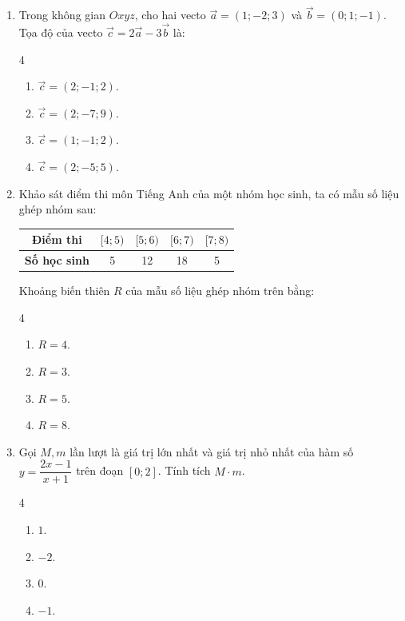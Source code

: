 \documentclass[12pt]{article}
\begin{document}
\begin{enumerate}[label=\textbf{Câu \arabic*.}, leftmargin=*]
		\item Trong không gian $Oxyz$, cho hai vecto $\vec{a} = (1; -2; 3)$ và $\vec{b} = (0; 1; -1)$. Tọa độ của vecto $\vec{c} = 2\vec{a} - 3\vec{b}$ là:
		\begin{multicols}{4}
			\begin{enumerate}[label=\Alph*.]
				\item $\vec{c} = (2; -1; 2)$.
				\item $\vec{c} = (2; -7; 9)$.
				\item $\vec{c} = (1; -1; 2)$.
				\item $\vec{c} = (2; -5; 5)$.
			\end{enumerate}
		\end{multicols}
		
		\item Khảo sát điểm thi môn Tiếng Anh của một nhóm học sinh, ta có mẫu số liệu ghép nhóm sau:
		\begin{center}
			\begin{tabular}{|c|c|c|c|c|}
				\hline
				\textbf{Điểm thi} & $[4; 5)$ & $[5; 6)$ & $[6; 7)$ & $[7; 8)$ \\
				\hline
				\textbf{Số học sinh} & 5 & 12 & 18 & 5 \\
				\hline
			\end{tabular}
		\end{center}
		Khoảng biến thiên $R$ của mẫu số liệu ghép nhóm trên bằng:
		\begin{multicols}{4}
			\begin{enumerate}[label=\Alph*.]
				\item $R = 4$.
				\item $R = 3$.
				\item $R = 5$.
				\item $R = 8$.
			\end{enumerate}
		\end{multicols}
		
		\item Gọi $M, m$ lần lượt là giá trị lớn nhất và giá trị nhỏ nhất của hàm số $y = \dfrac{2x - 1}{x + 1}$ trên đoạn $[0; 2]$. Tính tích $M \cdot m$.
		\begin{multicols}{4}
			\begin{enumerate}[label=\Alph*.]
				\item $1$.
				\item $-2$.
				\item $0$.
				\item $-1$.
			\end{enumerate}
		\end{multicols}
		

\end{enumerate}
\end{document}

